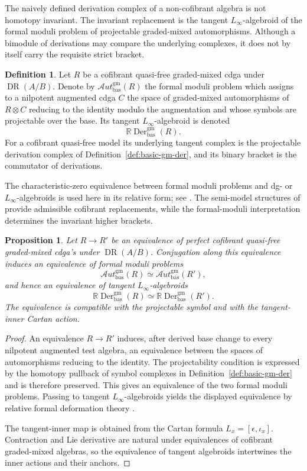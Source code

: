 \documentclass[11pt,reqno,a4paper,dvipsnames,x11names]{amsart}
\numberwithin{equation}{section}
\theoremstyle{plain}
\newtheorem{proposition}[theorem]{Proposition}
\theoremstyle{definition}
\newtheorem{definition}[theorem]{Definition}
\theoremstyle{remark}
\DeclareMathOperator{\Der}{Der}
\DeclareMathOperator{\DR}{DR}
\newcommand{\bas}{\mathrm{bas}}
\begin{document}
The naively defined derivation complex of a non-cofibrant algebra is not homotopy invariant. The invariant replacement is the tangent \(L_\infty\)-algebroid of the formal moduli problem of projectable graded-mixed automorphisms. Although a bimodule of derivations may compare the underlying complexes, it does not by itself carry the requisite strict bracket.

\begin{definition}
Let \(R\) be a cofibrant quasi-free graded-mixed cdga under \(\DR(A/B)\). Denote by
\(\mathcal{A}ut^{\mathrm{gm}}_{\bas}(R)\) the formal moduli problem which assigns to a nilpotent augmented cdga \(C\) the space of graded-mixed automorphisms of
\(R\otimes C\) reducing to the identity modulo the augmentation and whose symbols are projectable over the base. Its tangent \(L_\infty\)-algebroid is denoted
\[
 \mathbb R\Der^{\mathrm{gm}}_{\bas}(R).
\]
For a cofibrant quasi-free model its underlying tangent complex is the projectable derivation complex of Definition~\ref{def:basic-gm-der}, and its binary bracket is the commutator of derivations.
\end{definition}

The characteristic-zero equivalence between formal moduli problems and dg- or \(L_\infty\)-algebroids is used here in its relative form; see \cite{Hinich01,Pridham10,Nuiten,NuitenKoszul}. The semi-model structures of \cite{Nuiten} provide admissible cofibrant replacements, while the formal-moduli interpretation determines the invariant higher brackets.

\begin{proposition}\label{prop:homotopy-invariance-der}
Let \(R\to R'\) be an equivalence of perfect cofibrant quasi-free graded-mixed cdga's under \(\DR(A/B)\). Conjugation along this equivalence induces an equivalence of formal moduli problems
\[
 \mathcal{A}ut^{\mathrm{gm}}_{\bas}(R)
 \simeq
 \mathcal{A}ut^{\mathrm{gm}}_{\bas}(R'),
\]
and hence an equivalence of tangent \(L_\infty\)-algebroids
\[
 \mathbb R\Der^{\mathrm{gm}}_{\bas}(R)
 \simeq
 \mathbb R\Der^{\mathrm{gm}}_{\bas}(R').
\]
The equivalence is compatible with the projectable symbol and with the tangent-inner Cartan action.
\end{proposition}

\begin{proof}
An equivalence \(R\to R'\) induces, after derived base change to every nilpotent augmented test algebra, an equivalence between the spaces of automorphisms reducing to the identity. The projectability condition is expressed by the homotopy pullback of symbol complexes in Definition~\ref{def:basic-gm-der} and is therefore preserved. This gives an equivalence of the two formal moduli problems. Passing to tangent \(L_\infty\)-algebroids yields the displayed equivalence by relative formal deformation theory \cite{Hinich01,Pridham10,NuitenKoszul}.

The tangent-inner map is obtained from the Cartan formula
\(L_x=[\epsilon,\iota_x]\). Contraction and Lie derivative are natural under equivalences of cofibrant graded-mixed algebras, so the equivalence of tangent algebroids intertwines the inner actions and their anchors.
\end{proof}
\end{document}
